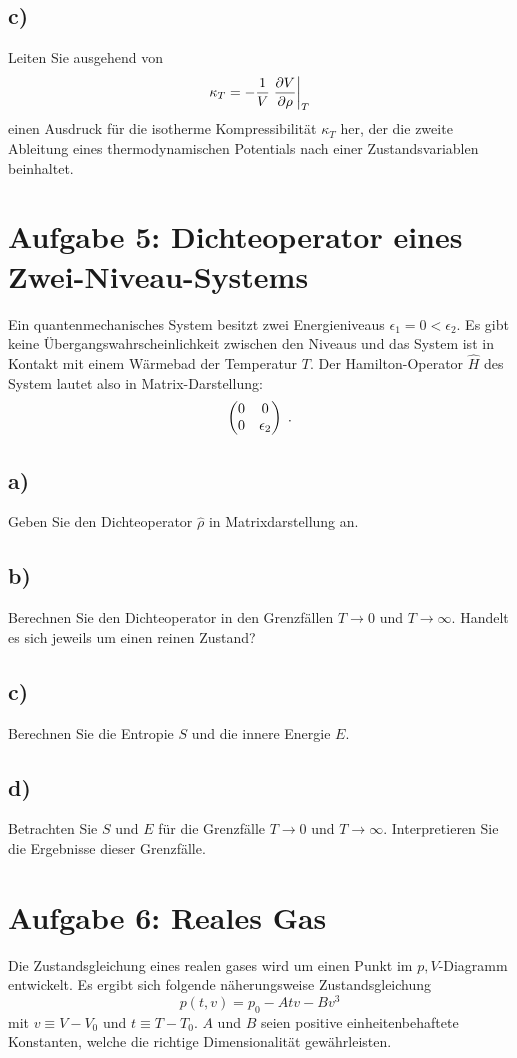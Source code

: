 \subsection{c)}
Leiten Sie ausgehend von
\[
    \kappa_T = -\frac{1}{V}\left.\frac{\partial V}{\partial \rho}\right\rvert_{T}    
\]
einen Ausdruck für die isotherme Kompressibilität $\kappa_T$ her, der die zweite Ableitung eines thermodynamischen Potentials nach einer Zustandsvariablen beinhaltet.

\section{Aufgabe 5: Dichteoperator eines Zwei-Niveau-Systems}
Ein quantenmechanisches System besitzt zwei Energieniveaus $\epsilon_1 = 0 < \epsilon_2$.
Es gibt keine Übergangswahrscheinlichkeit zwischen den Niveaus und das System ist in Kontakt mit einem Wärmebad der Temperatur $T$.
Der Hamilton-Operator $\hat H$ des System lautet also in Matrix-Darstellung:
\[
    \begin{pmatrix}0 & 0 \\ 0 & \epsilon_2\end{pmatrix} \;.    
\]

\subsection{a)}
Geben Sie den Dichteoperator $\hat\rho$ in Matrixdarstellung an.

\subsection{b)}
Berechnen Sie den Dichteoperator in den Grenzfällen $T \to 0$ und $T \to \infty$.
Handelt es sich jeweils um einen reinen Zustand?

\subsection{c)}
Berechnen Sie die Entropie $S$ und die innere Energie $E$.

\subsection{d)}
Betrachten Sie $S$ und $E$ für die Grenzfälle $T \to 0$ und $T \to \infty$.
Interpretieren Sie die Ergebnisse dieser Grenzfälle.


\section{Aufgabe 6: Reales Gas}
Die Zustandsgleichung eines realen gases wird um einen Punkt im $p,V$-Diagramm entwickelt.
Es ergibt sich folgende näherungsweise Zustandsgleichung
\[
    p(t,v) = p_0 - Atv - Bv^3
\]
mit $v \equiv V - V_0$ und $t \equiv T - T_0$. $A$ und $B$ seien positive einheitenbehaftete Konstanten, welche die richtige Dimensionalität gewährleisten.

